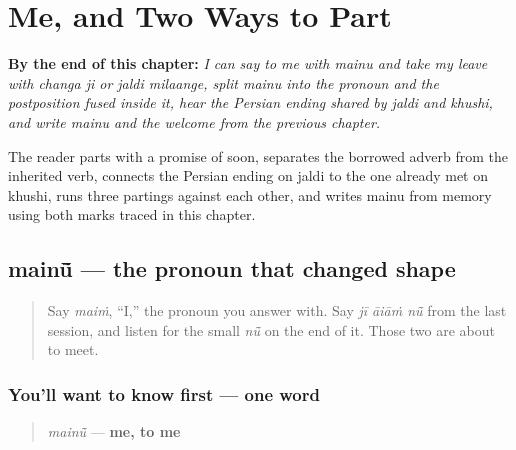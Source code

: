 
\chapter{Me, and Two Ways to Part}
\label{ch:pa-me-and-parting}

\begin{chapteropening}
\textbf{By the end of this chapter:} \emph{I can say to me with mainu and take my leave with changa ji or jaldi milaange, split mainu into the pronoun and the postposition fused inside it, hear the Persian ending shared by jaldi and khushi, and write mainu and the welcome from the previous chapter.}

The reader parts with a promise of soon, separates the borrowed adverb from the inherited verb, connects the Persian ending on jaldi to the one already met on khushi, runs three partings against each other, and writes mainu from memory using both marks traced in this chapter.
\end{chapteropening}

\section[\texorpdfstring{\pa{ਮੈਨੂੰ} (mainū̃)}{ਮੈਨੂੰ (mainū̃)}]{mainū̃ — the pronoun that changed shape}

\label{lesson:PA-C35-mainu}



\begin{quote}
Say \emph{maiṁ}, \textquotedblleft{}I,\textquotedblright{} the pronoun you answer with. Say \emph{jī āiāṁ nū̃} from the last session, and listen for the small \emph{nū̃} on the end of it. Those two are about to meet.
\end{quote}

\subsection*{You'll want to know first — one word}
\begin{quote}
\emph{mainū̃} — \textbf{me, to me}
\end{quote}

